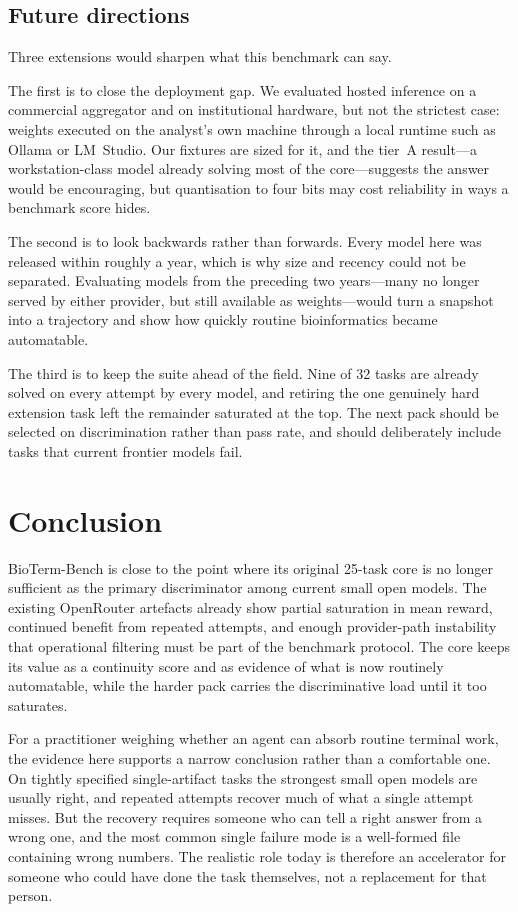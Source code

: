 \documentclass[11pt]{article}
\begin{document}
\subsection*{Future directions}

Three extensions would sharpen what this benchmark can say.

The first is to close the deployment gap.
We evaluated hosted inference on a commercial aggregator and on institutional hardware, but not the strictest case: weights executed on the analyst's own machine through a local runtime such as Ollama \citep{ollama} or LM~Studio.
Our fixtures are sized for it, and the tier~A result---a workstation-class model already solving most of the core---suggests the answer would be encouraging, but quantisation to four bits may cost reliability in ways a benchmark score hides.

The second is to look backwards rather than forwards.
Every model here was released within roughly a year, which is why size and recency could not be separated.
Evaluating models from the preceding two years---many no longer served by either provider, but still available as weights---would turn a snapshot into a trajectory and show how quickly routine bioinformatics became automatable.

The third is to keep the suite ahead of the field.
Nine of 32 tasks are already solved on every attempt by every model, and retiring the one genuinely hard extension task left the remainder saturated at the top.
The next pack should be selected on discrimination rather than pass rate, and should deliberately include tasks that current frontier models fail.

\section{Conclusion}

BioTerm-Bench is close to the point where its original 25-task core is no longer sufficient as the primary discriminator among current small open models.
The existing OpenRouter artefacts already show partial saturation in mean reward, continued benefit from repeated attempts, and enough provider-path instability that operational filtering must be part of the benchmark protocol.
The core keeps its value as a continuity score and as evidence of what is now routinely automatable, while the harder pack carries the discriminative load until it too saturates.

For a practitioner weighing whether an agent can absorb routine terminal work, the evidence here supports a narrow conclusion rather than a comfortable one.
On tightly specified single-artifact tasks the strongest small open models are usually right, and repeated attempts recover much of what a single attempt misses.
But the recovery requires someone who can tell a right answer from a wrong one, and the most common single failure mode is a well-formed file containing wrong numbers.
The realistic role today is therefore an accelerator for someone who could have done the task themselves, not a replacement for that person.
\end{document}
